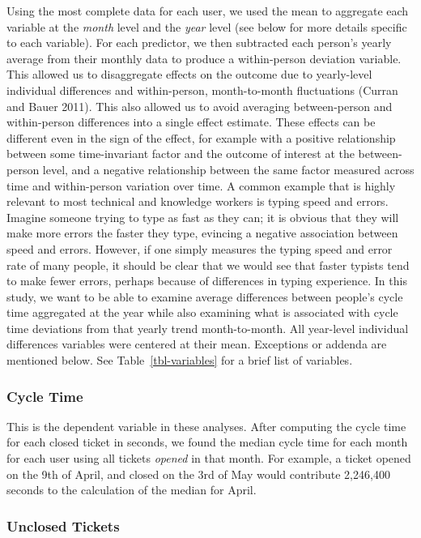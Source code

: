 \documentclass[
]{article}
\begin{document}
Using the most complete data for each user, we used the mean to
aggregate each variable at the \emph{month} level and the \emph{year}
level (see below for more details specific to each variable). For each
predictor, we then subtracted each person's yearly average from their
monthly data to produce a within-person deviation variable. This allowed
us to disaggregate effects on the outcome due to yearly-level individual
differences and within-person, month-to-month fluctuations (Curran and
Bauer 2011). This also allowed us to avoid averaging between-person and
within-person differences into a single effect estimate. These effects
can be different even in the sign of the effect, for example with a
positive relationship between some time-invariant factor and the outcome
of interest at the between-person level, and a negative relationship
between the same factor measured across time and within-person variation
over time. A common example that is highly relevant to most technical
and knowledge workers is typing speed and errors. Imagine someone trying
to type as fast as they can; it is obvious that they will make more
errors the faster they type, evincing a negative association between
speed and errors. However, if one simply measures the typing speed and
error rate of many people, it should be clear that we would see that
faster typists tend to make fewer errors, perhaps because of differences
in typing experience. In this study, we want to be able to examine
average differences between people's cycle time aggregated at the year
while also examining what is associated with cycle time deviations from
that yearly trend month-to-month. All year-level individual differences
variables were centered at their mean. Exceptions or addenda are
mentioned below. See Table~\ref{tbl-variables} for a brief list of
variables.

\subsubsection{Cycle Time}\label{cycle-time-1}

This is the dependent variable in these analyses. After computing the
cycle time for each closed ticket in seconds, we found the median cycle
time for each month for each user using all tickets \emph{opened} in
that month. For example, a ticket opened on the 9th of April, and closed
on the 3rd of May would contribute 2,246,400 seconds to the calculation
of the median for April.

\subsubsection{Unclosed Tickets}\label{unclosed-tickets}
\end{document}
